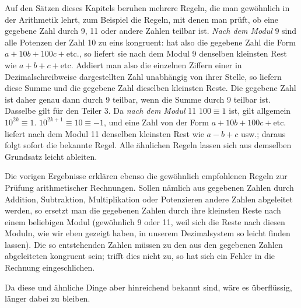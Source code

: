 Auf den Sätzen dieses Kapitels beruhen mehrere Regeln, die man gewöhnlich in der Arithmetik lehrt, zum Beispiel die Regeln, mit denen man prüft, ob eine gegebene Zahl durch 9, 11 oder andere Zahlen teilbar ist. \emph{Nach dem Modul} 9 sind alle Potenzen der Zahl 10 zu eins kongruent: hat also die gegebene Zahl die Form $a+10b+100c+\text{etc.}$, so liefert sie nach dem Modul 9 denselben kleinsten Rest wie $a+b+c+\text{etc.}$ Addiert man also die einzelnen Ziffern einer in Dezimalschreibweise dargestellten Zahl unabhängig von ihrer Stelle, so liefern diese Summe und die gegebene Zahl dieselben kleinsten Reste. Die gegebene Zahl ist daher genau dann durch 9 teilbar, wenn die Summe durch 9 teilbar ist. Dasselbe gilt für den Teiler 3. Da \emph{nach dem Modul} 11 $100\equiv 1$ ist, gilt allgemein $10^{2k}\equiv 1$. $10^{2k+1}\equiv 10\equiv -1$, und eine Zahl von der Form $a+10b+100c+\text{etc.}$ liefert nach dem Modul 11 denselben kleinsten Rest wie $a-b+c$ usw.; daraus folgt sofort die bekannte Regel. Alle ähnlichen Regeln lassen sich aus demselben Grundsatz leicht ableiten.

Die vorigen Ergebnisse erklären ebenso die gewöhnlich empfohlenen Regeln zur Prüfung arithmetischer Rechnungen. Sollen nämlich aus gegebenen Zahlen durch Addition, Subtraktion, Multiplikation oder Potenzieren andere Zahlen abgeleitet werden, so ersetzt man die gegebenen Zahlen durch ihre kleinsten Reste nach einem beliebigen Modul (gewöhnlich 9 oder 11, weil sich die Reste nach diesen Moduln, wie wir eben gezeigt haben, in unserem Dezimalsystem so leicht finden lassen). Die so entstehenden Zahlen müssen zu den aus den gegebenen Zahlen abgeleiteten kongruent sein; trifft dies nicht zu, so hat sich ein Fehler in die Rechnung eingeschlichen.

Da diese und ähnliche Dinge aber hinreichend bekannt sind, wäre es überflüssig, länger dabei zu bleiben.

\par\bigskip\bigskip{}
